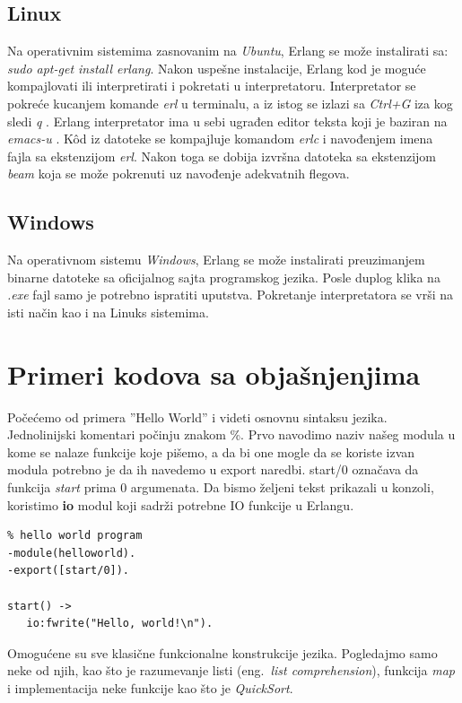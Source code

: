 \documentclass[a4paper]{article}
\begin{document}
\subsection{Linux}
\label{subsec:instalacijaLinux}
Na operativnim sistemima zasnovanim na {\em Ubuntu}, Erlang se može instalirati sa:
{\em sudo apt-get install erlang}. 
Nakon uspešne instalacije, Erlang kod je moguće kompajlovati
ili interpretirati i pokretati u interpretatoru.
Interpretator se pokreće kucanjem komande {\em erl} u terminalu, a iz istog
se izlazi sa {\em Ctrl+G} iza kog sledi {\em q} \cite{book_joe}.
Erlang interpretator ima u sebi ugrađen editor teksta koji je baziran na {\em emacs-u} \cite{book_fred}.
K\^od iz datoteke se kompajluje komandom {\em erlc} i navođenjem imena fajla sa ekstenzijom {\em erl}.
Nakon toga se dobija izvršna datoteka sa ekstenzijom {\em beam} koja se može
pokrenuti uz navođenje adekvatnih flegova. 


\subsection{Windows}
\label{subsec:instalacijaWindows}
Na operativnom sistemu {\em Windows}, Erlang se može instalirati preuzimanjem binarne datoteke sa oficijalnog sajta \cite{sajt} programskog jezika. Posle duplog klika na {\em .exe} fajl samo je potrebno ispratiti uputstva. Pokretanje interpretatora se vrši na isti način kao i na Linuks sistemima.


\section{Primeri kodova sa objašnjenjima}
\label{sec:primeri}
Počećemo od primera ''Hello World'' i videti osnovnu sintaksu jezika. 
Jednolinijski komentari počinju znakom \%. 
Prvo navodimo naziv našeg modula u kome se nalaze funkcije koje pišemo, 
a da bi one mogle da se koriste izvan modula potrebno je da ih navedemo u export naredbi. start/0 označava da funkcija \textit{start} prima 0 argumenata.
Da bismo željeni tekst prikazali u konzoli, koristimo \textbf{io} modul koji sadrži potrebne IO funkcije u Erlangu.
\begin{verbatim}
% hello world program
-module(helloworld). 
-export([start/0]). 

start() -> 
   io:fwrite("Hello, world!\n").

\end{verbatim}

Omogućene su sve klasične funkcionalne konstrukcije jezika. 
Pogledajmo samo neke od njih, kao što je razumevanje listi (eng.~{\em list comprehension}), funkcija {\em map} i implementacija neke funkcije kao što je {\em QuickSort}.\\
\end{document}
